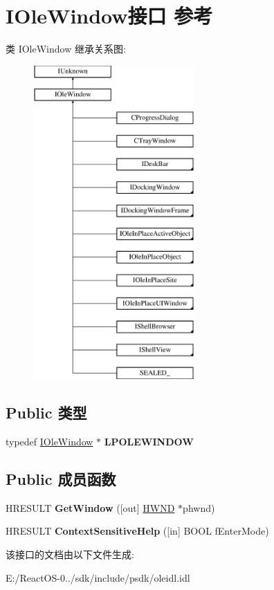 \hypertarget{interface_i_ole_window}{}\section{I\+Ole\+Window接口 参考}
\label{interface_i_ole_window}
类 I\+Ole\+Window 继承关系图\+:\begin{figure}[H]
\begin{center}
\leavevmode
\includegraphics[height=12.000000cm]{interface_i_ole_window}
\end{center}
\end{figure}
\subsection*{Public 类型}
\begin{DoxyCompactItemize}
\item 
\mbox{\label{interface_i_ole_window_a97e2c5f6785b753d76eeb6300c8185fa}} 
typedef \hyperlink{interface_i_ole_window}{I\+Ole\+Window} $\ast$ {\bfseries L\+P\+O\+L\+E\+W\+I\+N\+D\+OW}
\end{DoxyCompactItemize}
\subsection*{Public 成员函数}
\begin{DoxyCompactItemize}
\item 
\mbox{\label{interface_i_ole_window_a2bd9f914c408753673e5b1f2aa2aa811}} 
H\+R\+E\+S\+U\+LT {\bfseries Get\+Window} (\mbox{[}out\mbox{]} \hyperlink{interfacevoid}{H\+W\+ND} $\ast$phwnd)
\item 
\mbox{\label{interface_i_ole_window_ace390d742f46a866349c3401dffff16a}} 
H\+R\+E\+S\+U\+LT {\bfseries Context\+Sensitive\+Help} (\mbox{[}in\mbox{]} B\+O\+OL f\+Enter\+Mode)
\end{DoxyCompactItemize}


该接口的文档由以下文件生成\+:\begin{DoxyCompactItemize}
\item 
E\+:/\+React\+O\+S-\/0../sdk/include/psdk/oleidl.\+idl\end{DoxyCompactItemize}
